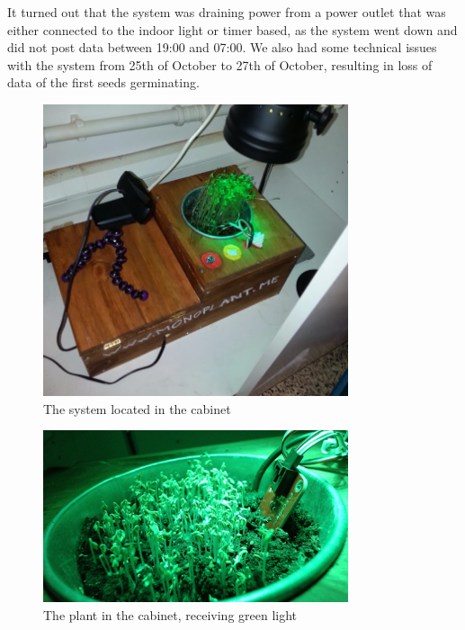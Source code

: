 It turned out that the system was draining power from a power outlet that was either connected to the indoor light or timer based, as the system went down and did not post data between 19:00 and 07:00. We also had some technical issues with the system from 25th of October to 27th of October, resulting in loss of data of the first seeds germinating.

\begin{figure}
\centering
\includegraphics[width=0.8\textwidth]{img/empiricalsetting/cupboard.jpg}
\caption{The system located in the cabinet}
\label{fig:cabinetplant}
\end{figure}

\begin{figure}
\centering
\includegraphics[width=0.8\textwidth]{img/empiricalsetting/cupboardsystem.jpg}
\caption{The plant in the cabinet, receiving green light}
\label{fig:cabinetsystemplant}
\end{figure}

